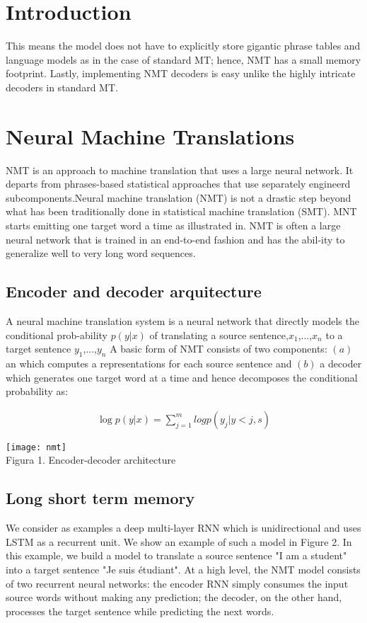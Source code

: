 \section{Introduction}

This means the model does not have to explicitly
store gigantic phrase tables and language models
as in  the case  of standard  MT; hence,  NMT has
a small memory footprint.   Lastly,  implementing
NMT decoders is easy unlike the highly intricate
decoders in standard MT.

\section{Neural Machine Translations}
NMT is an approach to machine translation that uses a large neural network. It departs from phrases-based statistical approaches that use separately engineerd subcomponents.Neural machine translation (NMT) is not a drastic step beyond what has been traditionally done in statistical machine translation (SMT). MNT starts emitting one target word a time  as illustrated in. NMT is often a large neural network that is trained in an end-to-end fashion and has the abil-ity to generalize well to very long word sequences.

\subsection{Encoder and decoder arquitecture}

A  neural  machine  translation  system  is  a  neural
network that directly models the conditional prob-ability $p(y|x)$ of translating a source sentence,$x_{1}$,...,$x_{n}$  to a target sentence $y_{1}$,...,$y_{n}$ A basic form of NMT consists of two components: $(a)$ an which computes a representations for each source sentence and $(b)$ a decoder which generates one target word at a time and hence decomposes the conditional
probability as:


\begin{gather*}
  \log p(y|x) = \sum_{j=1}^{m}log p(y_{j}|y<j,s)
\end{gather*}

\begin{center}
\texttt{[image: nmt]} \\%
    Figura 1. Encoder-decoder architecture
\end{center}

\subsection{Long short term memory}
We consider as examples a deep multi-layer RNN which is unidirectional and uses LSTM as a recurrent unit. We show an example of such a model in Figure 2. In this example, we build a model to translate a source sentence "I am a student" into a target sentence "Je suis étudiant". At a high level, the NMT model consists of two recurrent neural networks: the encoder RNN simply consumes the input source words without making any prediction; the decoder, on the other hand, processes the target sentence while predicting the next words.


